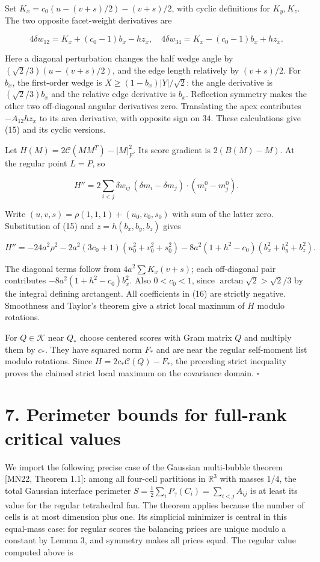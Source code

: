 \documentclass[
  11pt,
]{article}
\begin{document}
Set \(K_x=c_0(u-(v+s)/2)-(v+s)/2\), with cyclic definitions for
\(K_y,K_z\). The two opposite facet-weight derivatives are

\[
 4\delta w_{12}=K_x+(c_0-1)b_x-hz_x,
 \quad4\delta w_{34}=K_x-(c_0-1)b_x+hz_x.              \tag{15}
\]

Here a diagonal perturbation changes the half wedge angle by
\((\sqrt2/3)(u-(v+s)/2)\), and the edge length relatively by
\((v+s)/2\). For \(b_x\), the first-order wedge is
\(X\ge(1-b_x)|Y|/\sqrt2\): the angle derivative is \((\sqrt2/3)b_x\) and
the relative edge derivative is \(b_x\). Reflection symmetry makes the
other two off-diagonal angular derivatives zero. Translating the apex
contributes \(-A_{12}hz_x\) to its area derivative, with opposite sign
on \(34\). These calculations give (15) and its cyclic versions.

Let \(H(M)=2\mathcal C(MM^T)-|M|_F^2\). Its score gradient is
\(2(B(M)-M)\). At the regular point \(L=P\), so

\[
 H''=2\sum_{i<j}\delta w_{ij}\,
          (\delta m_i-\delta m_j)\cdot(m_i^0-m_j^0).
\]

Write \((u,v,s)=\rho(1,1,1)+(u_0,v_0,s_0)\) with sum of the latter zero.
Substitution of (15) and \(z=h(b_x,b_y,b_z)\) gives

\[
 H''=-24a^2\rho^2-2a^2(3c_0+1)(u_0^2+v_0^2+s_0^2)
       -8a^2(1+h^2-c_0)(b_x^2+b_y^2+b_z^2).           \tag{16}
\]

The diagonal terms follow from \(4a^2\sum K_x(v+s)\); each off-diagonal
pair contributes \(-8a^2(1+h^2-c_0)b_x^2\). Also \(0<c_0<1\), since
\(\arctan\sqrt2>\sqrt2/3\) by the integral defining arctangent. All
coefficients in (16) are strictly negative. Smoothness and Taylor's
theorem give a strict local maximum of \(H\) modulo rotations.

For \(Q\in\mathcal K\) near \(Q_*\) choose centered scores with Gram
matrix \(Q\) and multiply them by \(c_*\). They have squared norm
\(F_*\) and are near the regular self-moment list modulo rotations.
Since \(H=2c_*\mathcal C(Q)-F_*\), the preceding strict inequality
proves the claimed strict local maximum on the covariance domain.
\(\square\)

\section{7. Perimeter bounds for full-rank critical
values}\label{perimeter-bounds-for-full-rank-critical-values}

We import the following precise case of the Gaussian multi-bubble
theorem {[}MN22, Theorem 1.1{]}: among all four-cell partitions in
\(\mathbb R^3\) with masses \(1/4\), the total Gaussian interface
perimeter \(S=\frac12\sum_i P_\gamma(C_i)=\sum_{i<j}A_{ij}\) is at least
its value for the regular tetrahedral fan. The theorem applies because
the number of cells is at most dimension plus one. Its simplicial
minimizer is central in this equal-mass case: for regular scores the
balancing prices are unique modulo a constant by Lemma 3, and symmetry
makes all prices equal. The regular value computed above is
\end{document}
